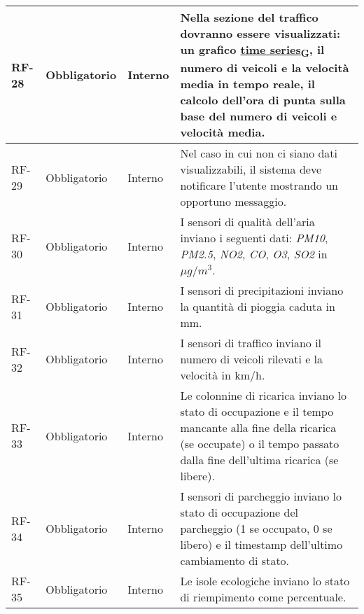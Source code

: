 \begin{longtable}{|>{\centering\arraybackslash}m{}|>{\centering\arraybackslash}m{}|>{\centering\arraybackslash}m{}|>{\centering\arraybackslash}m{}|}
	\\\hline
	RF-28           & Obbligatorio        & Interno                                                                                                           & Nella sezione del traffico dovranno essere visualizzati: un grafico \href{https://7last.github.io/docs/pb/documentazione-interna/glossario\#time-series}{time series\textsubscript{G}}, il numero di veicoli e la velocità media in tempo reale, il calcolo dell'ora di punta sulla base del numero di veicoli e velocità media.
	\\\hline
	RF-29           & Obbligatorio        & Interno                                                                                                           & Nel caso in cui non ci siano dati visualizzabili, il sistema deve notificare l'utente mostrando un opportuno messaggio.
	\\\hline
	RF-30           & Obbligatorio        & Interno                                                                                                           & I sensori di qualità dell'aria inviano i seguenti dati: \textit{PM10}, \textit{PM2.5}, \textit{NO2}, \textit{CO}, \textit{O3}, \textit{SO2} in $\mu g/m^3$.
	\\\hline
	RF-31           & Obbligatorio        & Interno                                                                                                           & I sensori di precipitazioni inviano la quantità di pioggia caduta in mm.
	\\\hline
	RF-32           & Obbligatorio        & Interno                                                                                                           & I sensori di traffico inviano il numero di veicoli rilevati e la velocità in km/h.
	\\\hline
	RF-33           & Obbligatorio        & Interno                                                                                                           & Le colonnine di ricarica inviano lo stato di occupazione e il tempo mancante alla fine della ricarica (se occupate) o il tempo passato dalla fine dell'ultima ricarica (se libere).
	\\\hline
	RF-34           & Obbligatorio        & Interno                                                                                                           & I sensori di parcheggio inviano lo stato di occupazione del parcheggio (1 se occupato, 0 se libero) e il timestamp dell'ultimo cambiamento di stato.
	\\\hline
	RF-35           & Obbligatorio        & Interno                                                                                                           & Le isole ecologiche inviano lo stato di riempimento come percentuale.

\end{longtable}
